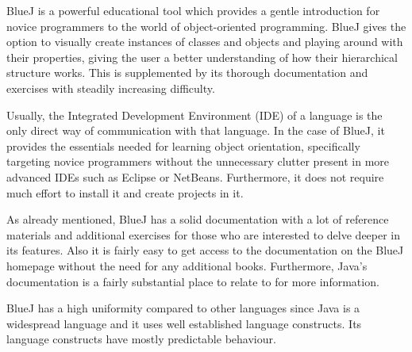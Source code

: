 \begin{description}[style=nextline]
\item[Pedagogic Value]
BlueJ is a powerful educational tool which provides a gentle introduction for novice programmers to the world of object-oriented programming.  BlueJ gives the option to visually create instances of classes and objects and playing around with their properties, giving the user a better understanding of how their hierarchical structure works. This is supplemented by its thorough documentation and exercises with steadily increasing difficulty.
\item[Environment]
Usually, the Integrated Development Environment (IDE) of a language is the only direct way of communication with that language. In the case of BlueJ, it provides the essentials needed for learning object orientation, specifically targeting novice programmers without the unnecessary clutter present in more advanced IDEs such as Eclipse or NetBeans. Furthermore, it does not require much effort to install it and create projects in it.
\item[Documentation]
As already mentioned, BlueJ has a solid documentation with a lot of reference materials and additional exercises for those who are interested to delve deeper in its features. Also it is fairly easy to get access to the documentation on the BlueJ homepage without the need for any additional books. Furthermore, Java's documentation is a fairly substantial place to relate to for more information.
\item[Uniformity]
BlueJ has a high uniformity compared to other languages since Java is a widespread language and it uses well established language constructs. Its language constructs have mostly predictable behaviour.
\end{description}